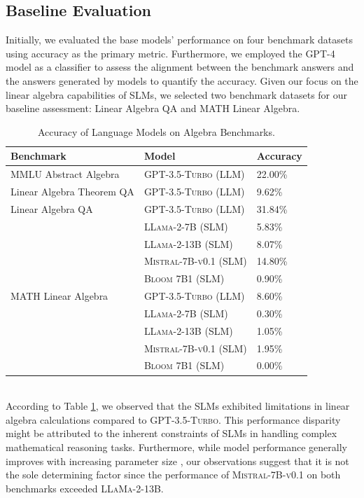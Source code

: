 \documentclass[10pt]{article}
\begin{document}
\subsection{Baseline Evaluation}
Initially, we evaluated the base models' performance on four benchmark datasets using accuracy as the primary metric. Furthermore, we employed the \textsc{GPT-4} model as a classifier to assess the alignment between the benchmark answers and the answers generated by models to quantify the accuracy. Given our focus on the linear algebra capabilities of SLMs, we selected two  benchmark datasets for our baseline assessment: Linear Algebra QA and MATH Linear Algebra.
\begin{table}[ht]
\centering
\renewcommand{\arraystretch}{0.8} %
\setlength{\tabcolsep}{10pt} %
\begin{tabular}{p{6cm} p{6cm} p{2cm}}
\toprule
\textbf{Benchmark} & \textbf{Model} & \textbf{Accuracy} \\
\midrule
MMLU Abstract Algebra 
    & \textsc{GPT-3.5-Turbo} (LLM) & 22.00\% \\
\midrule
Linear Algebra Theorem QA 
    & \textsc{GPT-3.5-Turbo} (LLM) & 9.62\% \\
\midrule
Linear Algebra QA 
    & \textsc{GPT-3.5-Turbo} (LLM) & 31.84\% \\
    & \textsc{LLama-2-7B} (SLM) & 5.83\% \\
    & \textsc{LLama-2-13B} (SLM) & 8.07\% \\
    & \textsc{Mistral-7B-v0.1} (SLM) & 14.80\% \\
    & \textsc{Bloom 7B1} (SLM) & 0.90\% \\
\midrule
MATH Linear Algebra 
    & \textsc{GPT-3.5-Turbo} (LLM) & 8.60\% \\
    & \textsc{LLama-2-7B} (SLM) & 0.30\% \\
    & \textsc{LLama-2-13B} (SLM) & 1.05\% \\
    & \textsc{Mistral-7B-v0.1} (SLM) & 1.95\% \\
    & \textsc{Bloom 7B1} (SLM) & 0.00\% \\
\bottomrule
\end{tabular}
\caption{Accuracy of Language Models on Algebra Benchmarks.}
\label{tab:model-performance}
\end{table}
\\
According to Table \ref{tab:model-performance}, we observed that the SLMs exhibited limitations in linear algebra calculations compared to \textsc{GPT-3.5-Turbo}. This performance disparity might be attributed to the inherent constraints of SLMs in handling complex mathematical reasoning tasks. Furthermore, while model performance generally improves with increasing parameter size \cite{kaplan2020scalinglawsneurallanguage}, our observations suggest that it is not the sole determining factor since the performance of \textsc{Mistral-7B-v0.1} on both benchmarks exceeded \textsc{LLaMa-2-13B}.
\end{document}
